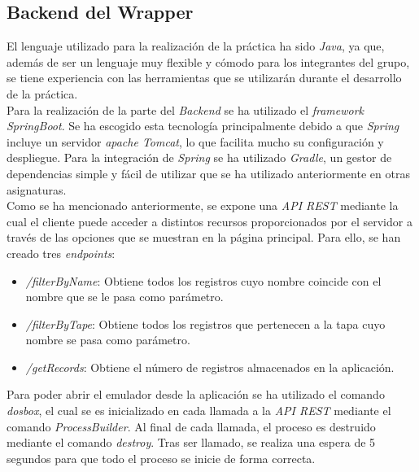 \documentclass[10pt,a4paper]{article}
\begin{document}
\subsection{Backend del Wrapper}
El lenguaje utilizado para la realización de la práctica ha sido \textit{Java}, ya que, además de ser un lenguaje muy flexible y cómodo para los integrantes del grupo, se tiene experiencia con las herramientas que se utilizarán durante el desarrollo de la práctica.\\

Para la realización de la parte del \textit{Backend} se ha utilizado el \textit{framework SpringBoot}. Se ha escogido esta tecnología principalmente debido a que \textit{Spring} incluye un servidor \textit{apache Tomcat}, lo que facilita mucho su configuración y despliegue. Para la integración de \textit{Spring} se ha utilizado \textit{Gradle}, un gestor de dependencias simple y fácil de utilizar que se ha utilizado anteriormente en otras asignaturas.\\

Como se ha mencionado anteriormente, se expone una \textit{API REST} mediante la cual el cliente puede acceder a distintos recursos proporcionados por el servidor a través de las opciones que se muestran en la página principal. Para ello, se han creado tres \textit{endpoints}:
\begin{itemize}
	\item \textit{/filterByName}: Obtiene todos los registros cuyo nombre coincide con el nombre que se le pasa como parámetro.
	\item \textit{/filterByTape}: Obtiene todos los registros que pertenecen a la tapa cuyo nombre se pasa como parámetro.
	\item \textit{/getRecords}: Obtiene el número de registros almacenados en la aplicación.
\end{itemize}
Para poder abrir el emulador desde la aplicación se ha utilizado el comando \textit{dosbox}, el cual se es inicializado en cada llamada a la \textit{API REST} mediante el comando \textit{ProcessBuilder}.  Al final de cada llamada, el proceso es destruido mediante el comando \textit{destroy}. Tras ser llamado, se realiza una espera de 5 segundos para que todo el proceso se inicie de forma correcta.\\
\end{document}
